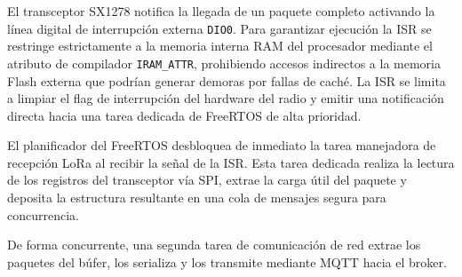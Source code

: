 El transceptor SX1278 notifica la llegada de un paquete completo activando la línea digital de interrupción externa \texttt{DIO0}. Para garantizar ejecución la ISR se restringe estrictamente a la memoria interna RAM del procesador mediante el atributo de compilador \texttt{IRAM\_ATTR}, prohibiendo accesos indirectos a la memoria Flash externa que podrían generar demoras por fallas de caché. La ISR se limita a limpiar el flag de interrupción del hardware del radio y emitir una notificación directa hacia una tarea dedicada de FreeRTOS de alta prioridad.


El planificador del FreeRTOS desbloquea de inmediato la tarea manejadora de recepción LoRa al recibir la señal de la ISR. Esta tarea dedicada realiza la lectura de los registros del transceptor vía SPI, extrae la carga útil del paquete y deposita la estructura resultante en una cola de mensajes segura para concurrencia.

De forma concurrente, una segunda tarea de comunicación de red extrae los paquetes del búfer, los serializa y los transmite mediante MQTT hacia el broker.
